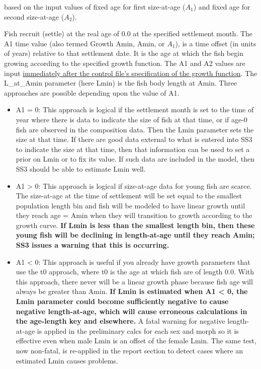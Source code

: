 based on the input values of fixed age for first size-at-age ($A_1$) and fixed age for second size-at-age ($A_2$). 

Fish recruit (settle) at the real age of 0.0 at the specified settlement month. The A1 time value (also termed Growth Amin, Amin, or $A_1$), is a time offset (in units of years) relative to that settlement date. It is the age at which the fish begin growing according to the specified growth function. The A1 and A2 values are input \hyperlink{Amin}{immediately after the control file's specification of the growth function}. The L\_at\_Amin parameter (here Lmin) is the fish body length at Amin. Three approaches are possible depending upon the value of A1.

\begin{itemize}
	\item A1 = 0: This approach is logical if the settlement month is set to the time of year where there is data to indicate the size of fish at that time, or if age-0 fish are observed in the composition data. Then the Lmin parameter sets the size at that time. If there are good data external to what is entered into SS3 to indicate the size at that time, then that information can be used to set a prior on Lmin or to fix its value. If such data are included in the model, then SS3 should be able to estimate Lmin well.
	\item A1 > 0: This approach is logical if size-at-age data for young fish are scarce. The size-at-age at the time of settlement will be set equal to the smallest population length bin and fish will be modeled to have linear growth until they reach age = Amin when they will transition to growth according to the growth curve. \textbf{If Lmin is less than the smallest length bin, then these young fish will be declining in length-at-age until they reach Amin; SS3 issues a warning that this is occurring.}
	\item A1 < 0: This approach is useful if you already have growth parameters that use the t0 approach, where t0 is the age at which fish are of length 0.0. With this approach, there never will be a linear growth phase because fish age will always be greater than Amin. \textbf{If Lmin is estimated when A1 < 0, the Lmin parameter could become sufficiently negative to cause negative length-at-age, which will cause erroneous calculations in the age-length key and elsewhere.} A fatal warning for negative length-at-age is applied in the preliminary calcs for each sex and morph so it is effective even when male Lmin is an offset of the female Lmin. The same test, now non-fatal, is re-applied in the report section to detect cases where an estimated Lmin causes problems. 
\end{itemize}


